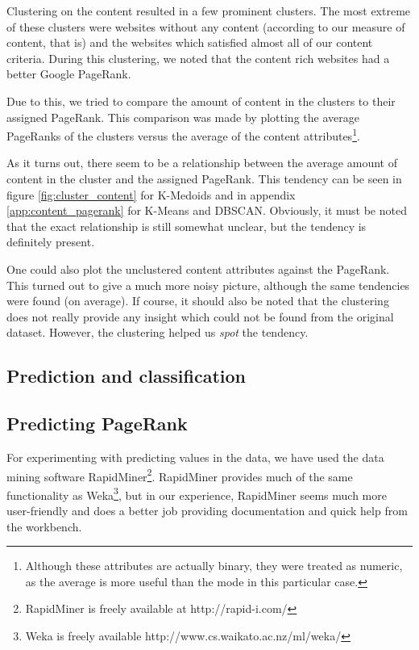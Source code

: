Clustering on the content resulted in a few prominent clusters. The most extreme of these clusters were websites without any content (according to our measure of content, that is) and the websites which satisfied almost all of our content criteria. During this clustering, we noted that the content rich websites had a better Google PageRank.

Due to this, we tried to compare the amount of content in the clusters to their assigned PageRank. This comparison was made by plotting the average PageRanks of the clusters versus the average of the content attributes\footnote{Although these attributes are actually binary, they were treated as numeric, as the average is more useful than the mode in this particular case.}.

As it turns out, there seem to be a relationship between the average amount of content in the cluster and the assigned PageRank. This tendency can be seen in figure \ref{fig:cluster_content} for K-Medoids and in appendix \ref{app:content_pagerank} for K-Means and DBSCAN. Obviously, it must be noted that the exact relationship is still somewhat unclear, but the tendency is definitely present.


One could also plot the unclustered content attributes against the PageRank. This turned out to give a much more noisy picture, although the same tendencies were found (on average). If course, it should also be noted that the clustering does not really provide any insight which could not be found from the original dataset. However, the clustering helped us \textit{spot} the tendency.

\subsection{Prediction and classification}
\label{subsec:predictclassify}

\subsection{Predicting PageRank}
\label{subsec:predection}
For experimenting with predicting values in the data, we have used the data mining software RapidMiner\footnote{RapidMiner is freely available at http://rapid-i.com/}. RapidMiner provides much of the same functionality as Weka\footnote{Weka is freely available http://www.cs.waikato.ac.nz/ml/weka/}, but in our experience, RapidMiner seems much more user-friendly and does a better job providing documentation and quick help from the workbench.

